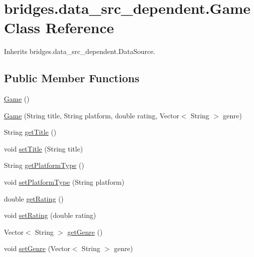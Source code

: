\hypertarget{classbridges_1_1data__src__dependent_1_1_game}{}\section{bridges.\+data\+\_\+src\+\_\+dependent.\+Game Class Reference}
\label{classbridges_1_1data__src__dependent_1_1_game}


Inherits bridges.\+data\+\_\+src\+\_\+dependent.\+Data\+Source.

\subsection*{Public Member Functions}
\begin{DoxyCompactItemize}
\item 
\hyperlink{classbridges_1_1data__src__dependent_1_1_game_a9f145dbcbbfbb0432a2cd8631e57173b}{Game} ()
\item 
\hyperlink{classbridges_1_1data__src__dependent_1_1_game_a2bb9d9f659184be2cc9fc68e38433492}{Game} (String title, String platform, double rating, Vector$<$ String $>$ genre)
\item 
String \hyperlink{classbridges_1_1data__src__dependent_1_1_game_af92a6fdd0e852e6cc5d97fb193be4ca9}{get\+Title} ()
\item 
void \hyperlink{classbridges_1_1data__src__dependent_1_1_game_a0c87151b75bc10357aa6829ebfc0cae3}{set\+Title} (String title)
\item 
String \hyperlink{classbridges_1_1data__src__dependent_1_1_game_a1eef8e419c6302ba83ea595491412494}{get\+Platform\+Type} ()
\item 
void \hyperlink{classbridges_1_1data__src__dependent_1_1_game_ab4d51e07186a9228c50210cf661304c7}{set\+Platform\+Type} (String platform)
\item 
double \hyperlink{classbridges_1_1data__src__dependent_1_1_game_a83b444e2c487701b4e9789a6a35ae210}{get\+Rating} ()
\item 
void \hyperlink{classbridges_1_1data__src__dependent_1_1_game_ab59c6ea5ee2721dcca2246e8e287154f}{set\+Rating} (double rating)
\item 
Vector$<$ String $>$ \hyperlink{classbridges_1_1data__src__dependent_1_1_game_ab3c0e46513e71b56a2970ac014b1bf79}{get\+Genre} ()
\item 
void \hyperlink{classbridges_1_1data__src__dependent_1_1_game_ab3c9d9cd9f0acdd7bdc6ea7e1b140868}{set\+Genre} (Vector$<$ String $>$ genre)
\end{DoxyCompactItemize}



